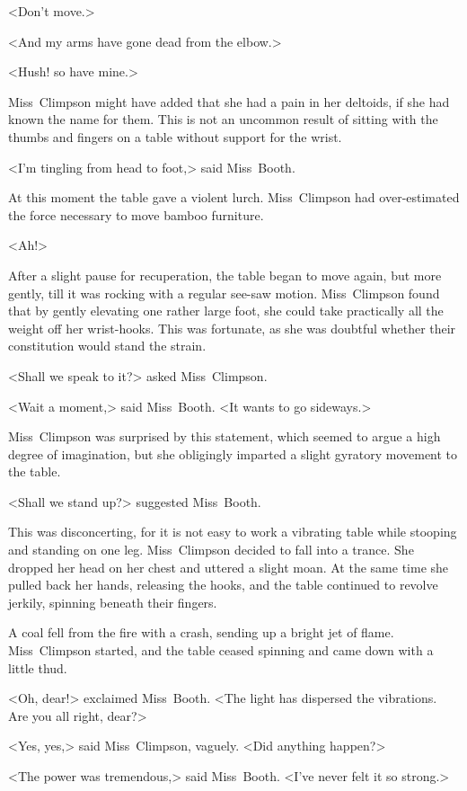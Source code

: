 <Don't move.>

<And my arms have gone dead from the elbow.>

<Hush! so have mine.>

Miss~Climpson might have added that she had a pain in her deltoids, if she had known the name for them. This is not an uncommon result of sitting with the thumbs and fingers on a table without support for the wrist.

<I'm tingling from head to foot,> said Miss~Booth.

At this moment the table gave a violent lurch. Miss~Climpson had over-estimated the force necessary to move bamboo furniture.

<Ah!>

After a slight pause for recuperation, the table began to move again, but more gently, till it was rocking with a regular see-saw motion. Miss~Climpson found that by gently elevating one rather large foot, she could take practically all the weight off her wrist-hooks. This was fortunate, as she was doubtful whether their constitution would stand the strain.

<Shall we speak to it?> asked Miss~Climpson.

<Wait a moment,> said Miss~Booth. <It wants to go sideways.>

Miss~Climpson was surprised by this statement, which seemed to argue a high degree of imagination, but she obligingly imparted a slight gyratory movement to the table.

<Shall we stand up?> suggested Miss~Booth.

This was disconcerting, for it is not easy to work a vibrating table while stooping and standing on one leg. Miss~Climpson decided to fall into a trance. She dropped her head on her chest and uttered a slight moan. At the same time she pulled back her hands, releasing the hooks, and the table continued to revolve jerkily, spinning beneath their fingers.

A coal fell from the fire with a crash, sending up a bright jet of flame. Miss~Climpson started, and the table ceased spinning and came down with a little thud.

<Oh, dear!> exclaimed Miss~Booth. <The light has dispersed the vibrations. Are you all right, dear?>

<Yes, yes,> said Miss~Climpson, vaguely. <Did anything happen?>

<The power was tremendous,> said Miss~Booth. <I've never felt it so strong.>

